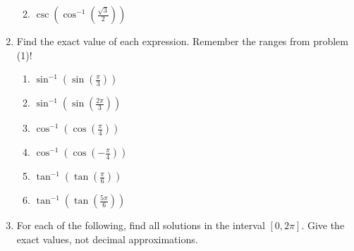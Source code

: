 \documentclass[12pt]{article}
\newif\ifans
\begin{document}
\begin{enumerate}
\begin{enumerate}
\ifans\fbox{$\displaystyle \frac{\sqrt{5}}{3}$}\fi

\item $\displaystyle \csc{\left(\cos^{-1}{\left(\frac{\sqrt{3}}{2}\right)}\right)}$

\ifans\fbox{$2$}\fi

\end{enumerate}

\item Find the exact value of each expression.  Remember the ranges from problem (1)!

\begin{enumerate}

\item $\displaystyle \sin^{-1}{\left(\sin{\left(\frac{\pi}{3}\right)}\right)}$

\ifans\fbox{$\displaystyle \frac{\pi}{3}$}\fi

\item $\displaystyle \sin^{-1}{\left(\sin{\left(\frac{2\pi}{3}\right)}\right)}$

\ifans\fbox{$\displaystyle \frac{\pi}{3}$}\fi

\item $\displaystyle \cos^{-1}{\left(\cos{\left(\frac{\pi}{4}\right)}\right)}$

\ifans\fbox{$\displaystyle \frac{\pi}{4}$}\fi

\item $\displaystyle \cos^{-1}{\left(\cos{\left(-\frac{\pi}{4}\right)}\right)}$

\ifans\fbox{$\displaystyle \frac{\pi}{4}$}\fi

\item $\displaystyle \tan^{-1}{\left(\tan{\left(\frac{\pi}{6}\right)}\right)}$

\ifans\fbox{$\displaystyle \frac{\pi}{6}$}\fi

\item $\displaystyle \tan^{-1}{\left(\tan{\left(\frac{5\pi}{6}\right)}\right)}$

\ifans\fbox{$\displaystyle -\frac{\pi}{6}$}\fi

\end{enumerate}

\newpage

\item For each of the following, find all solutions in the interval $[0,2\pi]$.  Give the exact values, not decimal approximations.

\begin{enumerate}


\end{enumerate}
\end{enumerate}
\end{document}
